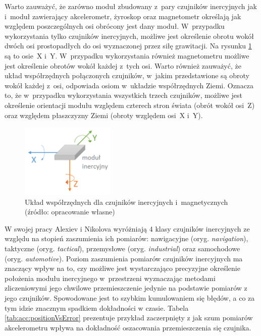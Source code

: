 Warto zauważyć, że zarówno moduł zbudowany z~pary czujników inercyjnych jak i~moduł zawierający akcelerometr, żyroskop oraz magnetometr określają jak względem poszczególnych osi obrócony jest dany moduł. W~przypadku wykorzystania tylko czujników inercyjnych, możliwe jest określenie obrotu wokół dwóch osi prostopadłych do osi wyznaczonej przez siłę grawitacji. Na rysunku \ref{fig:literature:imu:coordination} są to osie~X i~Y. W~przypadku wykorzystania również magnetometru możliwe jest określenie obrotów wokół każdej z~tych osi. Warto również zauważyć, że układ współrzędnych połączonych czujników, w~jakim przedstawione są obroty wokół każdej z~osi, odpowiada osiom w~układzie współrzędnych Ziemi. Oznacza to, że w~przypadku wykorzystania wszystkich trzech czujników, możliwe jest określenie orientacji modułu względem czterech stron świata (obrót wokół osi~Z) oraz względem płaszczyzny Ziemi (obroty względem osi~X i~Y).
			 
\begin{savenotes}
	\begin{figure}[!htb]
		\centering	
		\includegraphics[width=0.4\textwidth]{images/IMUAxes.png}
		\caption[Układ współrzędnych dla czujników inercyjnych i~magnetycznych]{Układ współrzędnych dla czujników inercyjnych i~magnetycznych (źródło: opracowanie własne)}
		\label{fig:literature:imu:coordination}
	\end{figure}
\end{savenotes}

W swojej pracy Alexiev i Nikolova \cite{Alexiev2013} wyróżniają 4 klasy czujników inercyjnych ze względu na stopień zaszumienia ich pomiarów: nawigacyjne (oryg. \emph{navigation}), taktyczne (oryg. \emph{tactical}), przemysłowe (oryg. \emph{industrial}) oraz samochodowe (oryg. \emph{automotive}). Poziom zaszumienia pomiarów czujników inercyjnych ma znaczący wpływ na to, czy możliwe jest wystarczająco precyzyjne określenie położenia modułu inercyjnego w~przestrzeni wyznaczając metodami zliczeniowymi jego chwilowe przemieszczenie jedynie na podstawie pomiarów z jego czujników. Spowodowane jest to szybkim kumulowaniem się błędów, a co za tym idzie znacznym spadkiem dokładności w czasie. Tabela \ref{tab:acc:positionVsError} prezentuje przykład zaczerpnięty z \cite{Alexiev2013} jak szum pomiarów akcelerometru wpływa na dokładność oszacowania przemieszczenia się czujnika.

